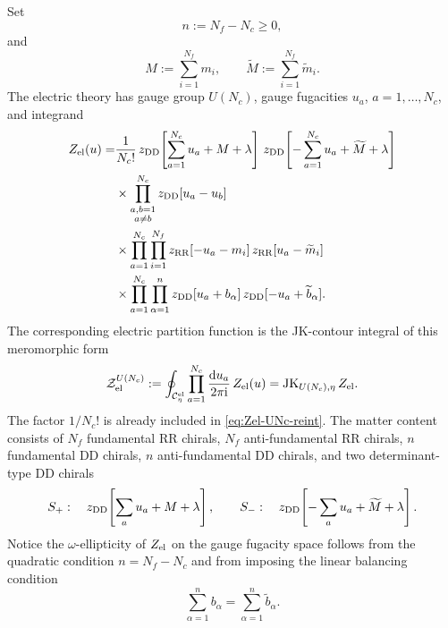 \documentclass[11pt,a4paper]{article}
\numberwithin{equation}{section}
\theoremstyle{plain}
\theoremstyle{definition}
\theoremstyle{remark}
\newcommand{\ii}{\mathrm{i}}
\newcommand{\dd}{\mathrm{d}}
\begin{document}
Set
\begin{equation}
n:=N_f-N_c\geq 0,
\end{equation}
and
\begin{equation}
M:=\sum_{i=1}^{N_f}m_i,
\qquad
\widetilde M:=\sum_{i=1}^{N_f}\widetilde m_i .
\label{eq:M-Mtilde}
\end{equation}
The electric theory has gauge group \(U(N_c)\), gauge fugacities \(u_a\), \(a=1,\ldots,N_c\), and integrand
\begin{equation}
\begin{aligned}
Z_{\rm el}(u)
=&\frac{1}{N_c!}\,
z_{\rm DD}\!\left[\sum_{a=1}^{N_c}u_a+M+\lambda\right]\,
z_{\rm DD}\!\left[-\sum_{a=1}^{N_c}u_a+\widetilde M+\lambda\right]
\\
&\times
\prod_{\substack{a,b=1\\ a\neq b}}^{N_c}
z_{\rm DD}[u_a-u_b]
\\
&\times
\prod_{a=1}^{N_c}\prod_{i=1}^{N_f}
z_{\rm RR}[-u_a-m_i]\,
z_{\rm RR}[u_a-\widetilde m_i]
\\
&\times
\prod_{a=1}^{N_c}\prod_{\alpha=1}^{n}
z_{\rm DD}[u_a+b_\alpha]\,
z_{\rm DD}[-u_a+\widetilde b_\alpha] .
\end{aligned}
\label{eq:Zel-UNc-reint}
\end{equation}
The corresponding electric partition function is the JK-contour integral of this meromorphic form
\begin{equation}
\mathcal Z_{\rm el}^{U(N_c)}
:=
\oint_{\mathcal C_\eta^{\rm el}}
\prod_{a=1}^{N_c}\frac{\dd u_a}{2\pi\ii}\,
Z_{\rm el}(u)
=
\operatorname{JK}_{U(N_c),\eta} Z_{\rm el} .
\label{eq:Zel-UNc-integral}
\end{equation}
The factor \(1/N_c!\) is already included in \eqref{eq:Zel-UNc-reint}.  The matter content consists of \(N_f\) fundamental RR chirals, \(N_f\) anti-fundamental RR chirals, \(n\) fundamental DD chirals, \(n\) anti-fundamental DD chirals, and two determinant-type DD chirals
\begin{equation}
S_+:\quad
z_{\rm DD}\!\left[\sum_a u_a+M+\lambda\right],
\qquad
S_-:\quad
z_{\rm DD}\!\left[-\sum_a u_a+\widetilde M+\lambda\right].
\end{equation}
Notice the \(\omega\)-ellipticity of \(Z_{\rm el}\) on the gauge fugacity space  follows from the quadratic condition \(n=N_f-N_c\) and from imposing the linear balancing condition
\begin{equation}
\sum_{\alpha=1}^{n}b_\alpha
=
\sum_{\alpha=1}^{n}\widetilde b_\alpha .
\label{eq:UNc-balancing-reint}
\end{equation}
\end{document}
